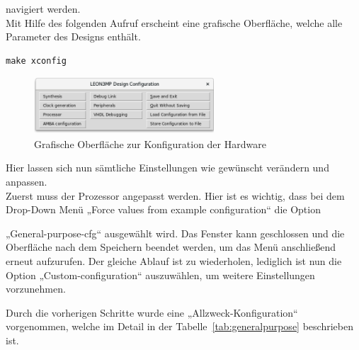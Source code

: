 navigiert werden.\\

Mit Hilfe des folgenden Aufruf erscheint eine grafische Oberfläche, welche alle Parameter des Designs enthält.\\
\begin{lstlisting}[caption={Aufruf des Konfigurationsmenüs},label={code:xconfig}]
make xconfig
   \end{lstlisting}




\begin{figure}[h!]
\centering
\includegraphics[width=0.6\textwidth]{Hauptteil/xconfig.png}
\caption{Grafische Oberfläche zur Konfiguration der Hardware}
\label{fig:xconfig}
\end{figure}

Hier lassen sich nun sämtliche Einstellungen wie gewünscht verändern und anpassen.\\

Zuerst muss der Prozessor angepasst werden. Hier ist es wichtig, dass bei dem Drop-Down Menü „Force values from example configuration“ die Option

„General-purpose-cfg“
ausgewählt wird. Das Fenster kann geschlossen und die Oberfläche nach dem Speichern beendet werden, um das Menü anschließend erneut aufzurufen.
Der gleiche Ablauf ist zu wiederholen, lediglich ist nun die Option
„Custom-configuration“ auszuwählen, um weitere Einstellungen vorzunehmen.

Durch die vorherigen Schritte wurde eine „Allzweck-Konfiguration“ vorgenommen, welche im Detail in der Tabelle~\ref{tab:generalpurpose} beschrieben ist.\\



